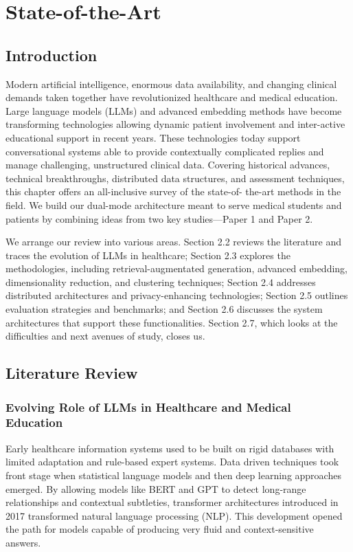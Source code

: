 \chapter{State-of-the-Art}

\section{Introduction}
Modern artificial intelligence, enormous data availability, and changing clinical demands taken together have revolutionized healthcare and medical education. Large language models (LLMs) and advanced embedding methods have become transforming technologies allowing dynamic patient involvement and inter-active educational support in recent years. These technologies today support conversational systems able to provide contextually complicated replies and manage challenging, unstructured clinical data. Covering historical advances, technical breakthroughs, distributed data structures, and assessment techniques, this chapter offers an all-inclusive survey of the state-of- the-art methods in the field. We build our dual-mode architecture meant to serve medical students and patients by combining ideas from two key studies—Paper 1 and Paper 2.

We arrange our review into various areas. Section 2.2 reviews the literature and traces the evolution of LLMs in healthcare; Section 2.3 explores the methodologies, including retrieval-augmentated generation, advanced embedding, dimensionality reduction, and clustering techniques; Section 2.4 addresses distributed architectures and privacy-enhancing technologies; Section 2.5 outlines evaluation strategies and benchmarks; and Section 2.6 discusses the system architectures that support these functionalities. Section 2.7, which looks at the difficulties and next avenues of study, closes us.

\section{Literature Review}

\subsection{Evolving Role of LLMs in Healthcare and Medical Education}
Early healthcare information systems used to be built on rigid databases with limited adaptation and rule-based expert systems. Data driven techniques took front stage when statistical language models and then deep learning approaches emerged. By allowing models like BERT and GPT to detect long-range relationships and contextual subtleties, transformer architectures introduced in 2017 transformed natural language processing (NLP). This development opened the path for models capable of producing very fluid and context-sensitive answers.


